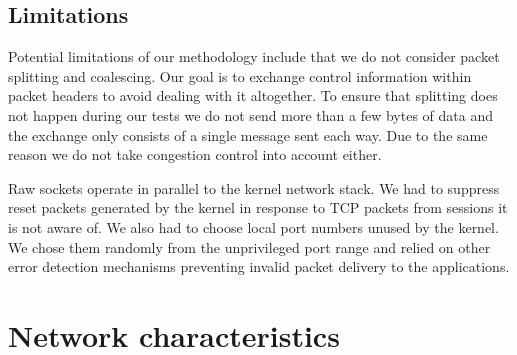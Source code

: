 \documentclass{sig-alternate-10pt}
\begin{document}

\subsection{Limitations}

Potential limitations of our methodology include that we do not consider packet splitting and coalescing. Our goal is to exchange control information within packet headers to avoid dealing with it altogether. To ensure that splitting does not happen during our tests we do not send more than a few bytes of data and the exchange only consists of a single message sent each way. Due to the same reason we do not take congestion control into account either.

Raw sockets operate in parallel to the kernel network stack. We had to suppress reset packets generated by the kernel in response to TCP packets from sessions it is not aware of. We also had to choose local port numbers unused by the kernel. We chose them randomly from the unprivileged port range and relied on other error detection mechanisms preventing invalid packet delivery to the applications.

\section{Network characteristics}
\label{sec:network}
\end{document}
